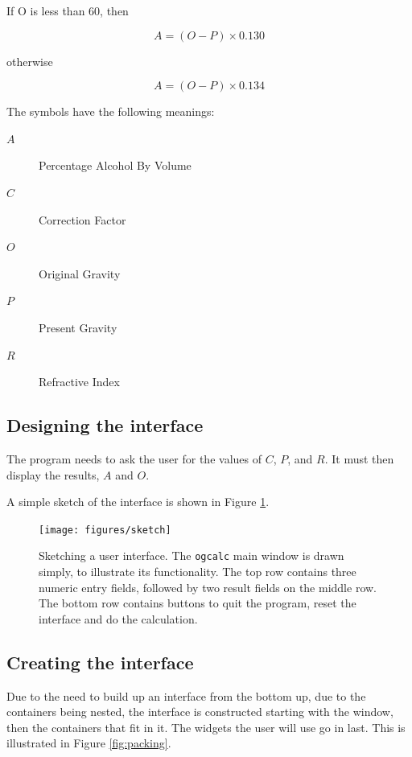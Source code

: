 \documentclass[a4paper,oneside]{article}
\newcommand{\program}[1]{\texttt{#1}}
\begin{document}
\noindent If O is less than 60, then

\begin{equation}
A = (O - P) \times 0.130
\end{equation}

\noindent otherwise

\begin{equation}
A = (O - P) \times 0.134
\end{equation}

\noindent The symbols have the following meanings:
\begin{description}
\item[$A$] Percentage Alcohol By Volume
\item[$C$] Correction Factor
\item[$O$] Original Gravity
\item[$P$] Present Gravity
\item[$R$] Refractive Index
\end{description}


\subsection{Designing the interface}

The program needs to ask the user for the values of $C$, $P$, and
$R$.  It must then display the results, $A$ and $O$.

A simple sketch of the interface is shown in Figure \ref{fig:sketch}.

\begin{figure}
  \centering
  \texttt{[image: figures/sketch]}
  \caption[Sketching a user interface]{Sketching a user interface.
    The \program{ogcalc} main window is drawn simply, to illustrate
    its functionality.  The top row contains three numeric entry
    fields, followed by two result fields on the middle row.  The
    bottom row contains buttons to quit the program, reset the
    interface and do the calculation.}
  \label{fig:sketch}
\end{figure}

\subsection{Creating the interface}

Due to the need to build up an interface from the bottom up, due to
the containers being nested, the interface is constructed starting
with the window, then the containers that fit in it.  The widgets the
user will use go in last.  This is illustrated in Figure
\ref{fig:packing}.
\end{document}
